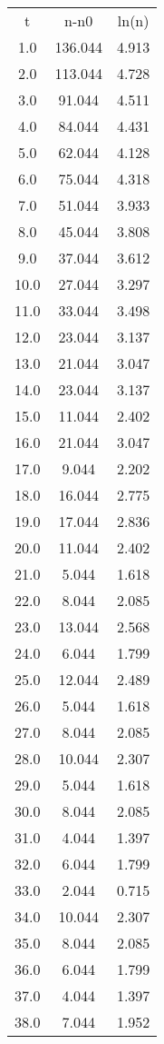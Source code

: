 \begin{table}
\begin{tabular}{ccc}
t & n-n0 & ln(n) \\
1.0 & 136.044 & 4.913 \\
2.0 & 113.044 & 4.728 \\
3.0 & 91.044 & 4.511 \\
4.0 & 84.044 & 4.431 \\
5.0 & 62.044 & 4.128 \\
6.0 & 75.044 & 4.318 \\
7.0 & 51.044 & 3.933 \\
8.0 & 45.044 & 3.808 \\
9.0 & 37.044 & 3.612 \\
10.0 & 27.044 & 3.297 \\
11.0 & 33.044 & 3.498 \\
12.0 & 23.044 & 3.137 \\
13.0 & 21.044 & 3.047 \\
14.0 & 23.044 & 3.137 \\
15.0 & 11.044 & 2.402 \\
16.0 & 21.044 & 3.047 \\
17.0 & 9.044 & 2.202 \\
18.0 & 16.044 & 2.775 \\
19.0 & 17.044 & 2.836 \\
20.0 & 11.044 & 2.402 \\
21.0 & 5.044 & 1.618 \\
22.0 & 8.044 & 2.085 \\
23.0 & 13.044 & 2.568 \\
24.0 & 6.044 & 1.799 \\
25.0 & 12.044 & 2.489 \\
26.0 & 5.044 & 1.618 \\
27.0 & 8.044 & 2.085 \\
28.0 & 10.044 & 2.307 \\
29.0 & 5.044 & 1.618 \\
30.0 & 8.044 & 2.085 \\
31.0 & 4.044 & 1.397 \\
32.0 & 6.044 & 1.799 \\
33.0 & 2.044 & 0.715 \\
34.0 & 10.044 & 2.307 \\
35.0 & 8.044 & 2.085 \\
36.0 & 6.044 & 1.799 \\
37.0 & 4.044 & 1.397 \\
38.0 & 7.044 & 1.952 \\

\end{tabular}
\end{table}
